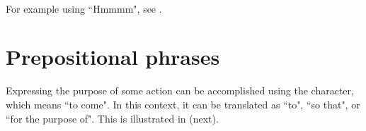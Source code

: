 \begin{example}
\mbox{}\\
\label{ex:interjections}
For example using ``Hmmmm", see .
\end{example}

\section{Prepositional phrases}
\hfill%
\begin{minipage}{\tw-35mm}%
  Expressing the purpose of some action can be accomplished using the 
 character, which means ``to come".
  In this context, it can be translated as ``to", ``so that", or ``for the purpose of".
  This is illustrated in  (next).
\end{minipage}

